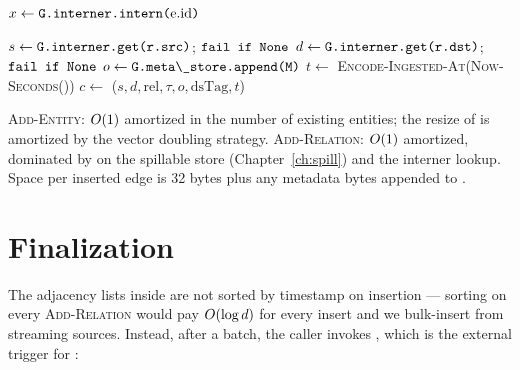 \begin{algorithm}
\caption{\textsc{Add-Entity}}\label{alg:add-entity}
$x \gets \code{G.interner.intern(}\text{e.id}\code{)}$\;
\;
\;
\;
\;
\;
\Return\;
\end{algorithm}

\begin{algorithm}
\caption{\textsc{Add-Relation}}\label{alg:add-relation}
$s \gets \code{G.interner.get(r.src)}$; $\code{fail if None}$\;
$d \gets \code{G.interner.get(r.dst)}$; $\code{fail if None}$\;
$o \gets \code{G.meta\_store.append(M)}$\;
$t \gets $ \textsc{Encode-Ingested-At}(\textsc{Now-Seconds}())\;
$c \gets $ \Compact{}($s, d, \text{rel}, \tau, o, \text{dsTag}, t$)\;
\;
\;
\Return\;
\end{algorithm}

\begin{complexity}
\textsc{Add-Entity}: $O(1)$ amortized in the number of existing
entities; the resize of  is amortized by
the vector doubling strategy. \textsc{Add-Relation}: $O(1)$
amortized, dominated by  on the spillable store
(Chapter~\ref{ch:spill}) and the interner lookup. Space per inserted
edge is 32 bytes plus any metadata bytes appended to
.
\end{complexity}

\section{Finalization}

The adjacency lists inside  are not sorted by
timestamp on insertion --- sorting on every \textsc{Add-Relation}
would pay $O(\log d)$ for every insert and we bulk-insert from
streaming sources. Instead, after a batch, the caller invokes
, which is the external trigger for
:

\begin{algorithm}
\caption{\textsc{Sort-Edges-By-Timestamp}}\label{alg:finalize-sort}
\end{algorithm}


